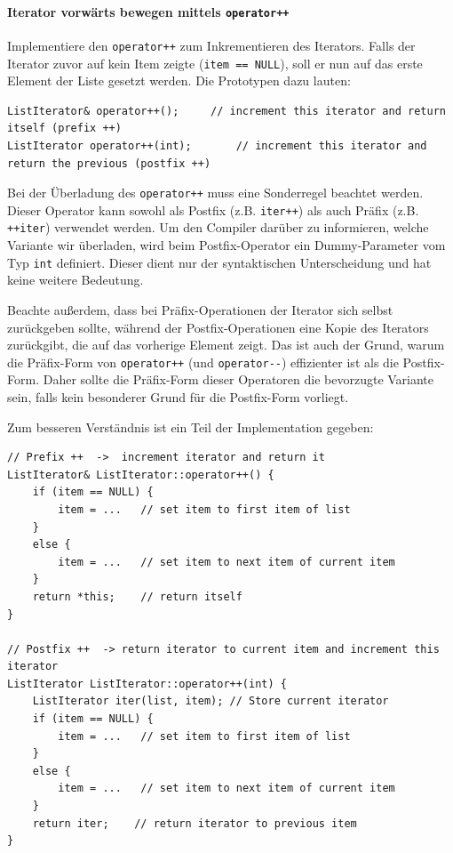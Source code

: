 \paragraph{Iterator vorwärts bewegen mittels \lstinline{operator++}}

Implementiere den \lstinline{operator++} zum Inkrementieren des Iterators.
Falls der Iterator zuvor auf kein Item zeigte (\lstinline{item == NULL}), soll er nun auf das erste Element der Liste gesetzt werden.
Die Prototypen dazu lauten:
\begin{lstlisting}
ListIterator& operator++();		// increment this iterator and return itself (prefix ++)
ListIterator operator++(int);		// increment this iterator and return the previous (postfix ++)
\end{lstlisting}

Bei der Überladung des \lstinline{operator++} muss eine Sonderregel beachtet werden.
Dieser Operator kann sowohl als Postfix (z.B. \lstinline{iter++}) als auch Präfix (z.B. \lstinline{++iter}) verwendet werden.
Um den Compiler darüber zu informieren, welche Variante wir überladen, wird beim Postfix-Operator ein Dummy-Parameter vom Typ \lstinline{int} definiert.
Dieser dient nur der syntaktischen Unterscheidung und hat keine weitere Bedeutung.

Beachte außerdem, dass bei Präfix-Operationen der Iterator sich selbst zurückgeben sollte, während der Postfix-Operationen eine Kopie des Iterators zurückgibt, die auf das vorherige Element zeigt.
Das ist auch der Grund, warum die Präfix-Form von \lstinline{operator++} (und \lstinline{operator--}) effizienter ist als die Postfix-Form.
Daher sollte die Präfix-Form dieser Operatoren die bevorzugte Variante sein, falls kein besonderer Grund für die Postfix-Form vorliegt.

Zum besseren Verständnis ist ein Teil der Implementation gegeben:

\begin{lstlisting}
// Prefix ++  ->  increment iterator and return it
ListIterator& ListIterator::operator++() {
	if (item == NULL) {
		item = ...	 // set item to first item of list
	}
	else {
		item = ...	 // set item to next item of current item
	}
	return *this;	 // return itself
}

// Postfix ++  -> return iterator to current item and increment this iterator
ListIterator ListIterator::operator++(int) {
	ListIterator iter(list, item); // Store current iterator
	if (item == NULL) {
		item = ...	 // set item to first item of list
	}
	else {
		item = ...	 // set item to next item of current item
	}
	return iter; 	// return iterator to previous item
}
\end{lstlisting}


